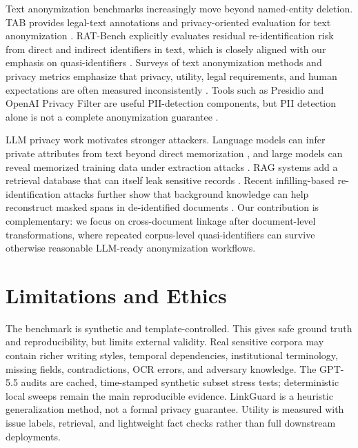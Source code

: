 \documentclass{article}
\newcommand{\method}{LinkGuard}
\begin{document}
Text anonymization benchmarks increasingly move beyond named-entity deletion.
TAB provides legal-text annotations and privacy-oriented evaluation for text anonymization \citep{pilan2022tab}.
RAT-Bench explicitly evaluates residual re-identification risk from direct and indirect identifiers in text, which is closely aligned with our emphasis on quasi-identifiers \citep{krco2026ratbench}.
Surveys of text anonymization methods and privacy metrics emphasize that privacy, utility, legal requirements, and human expectations are often measured inconsistently \citep{deusser2025survey,ren2025metrics}.
Tools such as Presidio and OpenAI Privacy Filter are useful PII-detection components, but PII detection alone is not a complete anonymization guarantee \citep{presidio,openai2026privacyfilter}.

LLM privacy work motivates stronger attackers.
Language models can infer private attributes from text beyond direct memorization \citep{staab2024beyond}, and large models can reveal memorized training data under extraction attacks \citep{carlini2021extracting,nasr2023scalable}.
RAG systems add a retrieval database that can itself leak sensitive records \citep{zeng2024ragprivacy,jiang2024ragthief}.
Recent infilling-based re-identification attacks further show that background knowledge can help reconstruct masked spans in de-identified documents \citep{charpentier2025infilling}.
Our contribution is complementary: we focus on cross-document linkage after document-level transformations, where repeated corpus-level quasi-identifiers can survive otherwise reasonable LLM-ready anonymization workflows.

\section{Limitations and Ethics}

The benchmark is synthetic and template-controlled.
This gives safe ground truth and reproducibility, but limits external validity.
Real sensitive corpora may contain richer writing styles, temporal dependencies, institutional terminology, missing fields, contradictions, OCR errors, and adversary knowledge.
The GPT-5.5 audits are cached, time-stamped synthetic subset stress tests; deterministic local sweeps remain the main reproducible evidence.
\method{} is a heuristic generalization method, not a formal privacy guarantee.
Utility is measured with issue labels, retrieval, and lightweight fact checks rather than full downstream deployments.
\end{document}
